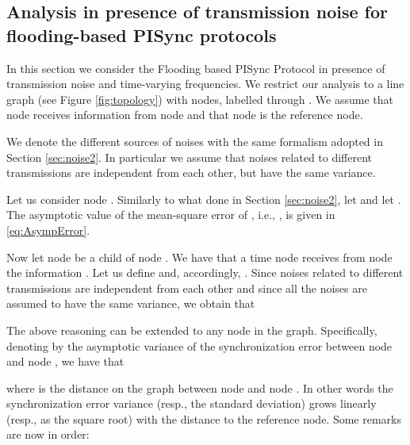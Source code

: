 \documentclass[english,a4paper,10pt,final]{article}
\numberwithin{equation}{section}
\numberwithin{figure}{section}
\begin{document}
\subsection{Analysis in presence of transmission noise for flooding-based PISync protocols}
\label{sec:noise}

In this section we consider the Flooding based PISync Protocol in presence of transmission noise and time-varying frequencies. We restrict our analysis to a line graph (see Figure \ref{fig:topology}) with  nodes, labelled  through . We assume that node  receives information from node  and that node  is the reference node.

We denote the different sources of noises with the same formalism adopted in Section \ref{sec:noise2}. In particular we assume that noises related to different transmissions are independent from each other, but have the same variance. 

Let us consider node . Similarly to what done in Section \ref{sec:noise2}, let  and let . The asymptotic value of the mean-square error of , i.e., , is given in \eqref{eq:AsympError}.

Now let node  be a child of node . We have that a time  node  receives from node  the information . Let us define  and, accordingly, . Since 
noises related to different transmissions are independent from each other and since all the noises are assumed to have the same variance, we obtain that

The above reasoning can be extended to any node in the graph. Specifically, denoting by  the asymptotic variance of the synchronization error between node  and node , we have that

where  is the distance on the graph between node  and node . In other words the synchronization error variance (resp., the standard deviation) grows linearly (resp., as the square root) with the distance to the reference node.
Some remarks are now in order:
\end{document}
